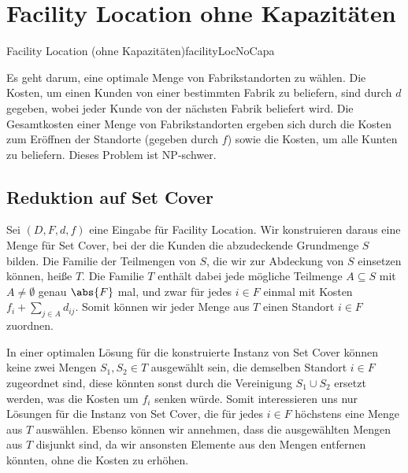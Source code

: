 \documentclass[language=ngerman,algolist]{TemplateLecture}
\begin{document}
\section{Facility Location ohne Kapazitäten}
\begin{prob}{Facility Location (ohne Kapazitäten)}{facilityLocNoCapa}
\end{prob}
Es geht darum, eine optimale Menge von Fabrikstandorten zu wählen. Die Kosten, um einen Kunden von einer bestimmten Fabrik zu beliefern, sind durch $d$ gegeben, wobei jeder Kunde von der nächsten Fabrik beliefert wird. Die Gesamtkosten einer Menge von Fabrikstandorten ergeben sich durch die Kosten zum Eröffnen der Standorte (gegeben durch $f$) sowie die Kosten, um alle Kunten zu beliefern. Dieses Problem ist NP-schwer.

\subsection{Reduktion auf Set Cover}

Sei $(D, F, d, f)$ eine Eingabe für Facility Location. Wir konstruieren daraus eine Menge für Set Cover, bei der die Kunden die abzudeckende Grundmenge $S$ bilden. Die Familie der Teilmengen von $S$, die wir zur Abdeckung von $S$ einsetzen können, heiße $T$. Die Familie $T$ enthält dabei jede mögliche Teilmenge $A \subseteq S$ mit $A \neq \emptyset$ genau $\abs{F}$ mal, und zwar für jedes $i \in F$ einmal mit Kosten $f_i + \sum_{j \in A} d_{ij}$. Somit können wir jeder Menge aus $T$ einen Standort $i \in F$ zuordnen.

In einer optimalen Lösung für die konstruierte Instanz von Set Cover können keine zwei Mengen $S_1, S_2 \in T$ ausgewählt sein, die demselben Standort $i \in F$ zugeordnet sind, diese könnten sonst durch die Vereinigung $S_1 \cup S_2$ ersetzt werden, was die Kosten um $f_i$ senken würde. Somit interessieren uns nur Lösungen für die Instanz von Set Cover, die für jedes $i \in F$ höchstens eine Menge aus $T$ auswählen. Ebenso können wir annehmen, dass die ausgewählten Mengen aus $T$ disjunkt sind, da wir ansonsten Elemente aus den Mengen entfernen könnten, ohne die Kosten zu erhöhen.
\end{document}
